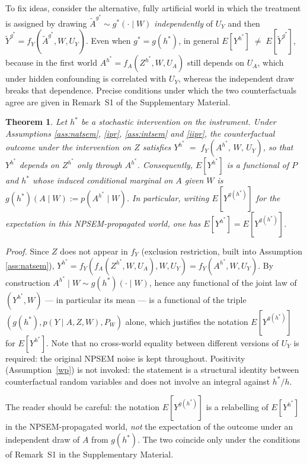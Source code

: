 \documentclass[12pt]{article}
\theoremstyle{thmstyleone}%
\newtheorem{theo}{Theorem}%
\theoremstyle{thmstyletwo}%
\theoremstyle{thmstylethree}%
\begin{document}
 {To fix ideas, consider the alternative, fully artificial world in which the treatment is assigned by drawing $\widetilde A^{g^*} \sim g^*(\cdot\mid W)$ \emph{independently} of $U_Y$ and then $\widetilde Y^{g^*} = f_Y(\widetilde A^{g^*}, W, U_Y)$. Even when $g^* = g(h^*)$, in general $E\!\left[Y^{h^*}\right] \;\neq\; E\!\left[\widetilde Y^{g^*}\right]$, because in the first world $A^{h^*} = f_A(Z^{h^*},W,U_A)$ still depends on $U_A$, which under hidden confounding is correlated with $U_Y$, whereas the independent draw breaks that dependence. Precise conditions under which the two counterfactuals agree are given in Remark~S1 of the Supplementary Material.}


\begin{theo}\label{propoim}
 {Let $h^*$ be a stochastic intervention on the instrument. Under Assumptions \ref{ass:natsem}, \ref{ipr}, \ref{ass:intsem} and \ref{iipr}, the counterfactual outcome under the intervention on $Z$ satisfies $Y^{h^*} \;=\; f_Y\!\left(A^{h^*},\,W,\,U_Y\right)$,
so that $Y^{h^*}$ depends on $Z^{h^*}$ only through $A^{h^*}$. Consequently, $E[Y^{h^*}]$ is a functional of $P$ and $h^*$ whose induced conditional marginal on $A$ given $W$ is $g(h^*)(A\mid W) := p(A^{h^*}\mid W)$. In particular, writing $E[Y^{g(h^*)}]$ for the expectation in this NPSEM-propagated world, one has $E[Y^{h^*}] = E[Y^{g(h^*)}]$.}
	\end{theo}
	
	 {\textit{Proof.} Since $Z$ does not appear in $f_Y$ (exclusion restriction, built into Assumption \ref{ass:natsem}), $Y^{h^*} = f_Y(f_A(Z^{h^*},W,U_A),W,U_Y) = f_Y(A^{h^*},W,U_Y)$. By construction $A^{h^*}\mid W \sim g(h^*)(\cdot\mid W)$, hence any functional of the joint law of $(Y^{h^*},W)$ --- in particular its mean --- is a functional of the triple $(g(h^*), p(Y\mid A,Z,W), P_W)$ alone, which justifies the notation $E[Y^{g(h^*)}]$ for $E[Y^{h^*}]$. Note that no cross-world equality between different versions of $U_Y$ is required: the original NPSEM noise is kept throughout.}  {Positivity (Assumption~\ref{wp}) is not invoked: the statement is a structural identity between counterfactual random variables and does not involve an integral against $h^*/h$.}
	
	 {The reader should be careful: the notation $E[Y^{g(h^*)}]$ is a relabelling of $E[Y^{h^*}]$ in the NPSEM-propagated world, \emph{not} the expectation of the outcome under an independent draw of $A$ from $g(h^*)$. The two coincide only under the conditions of Remark~S1 in the Supplementary Material.}
	
\end{document}
